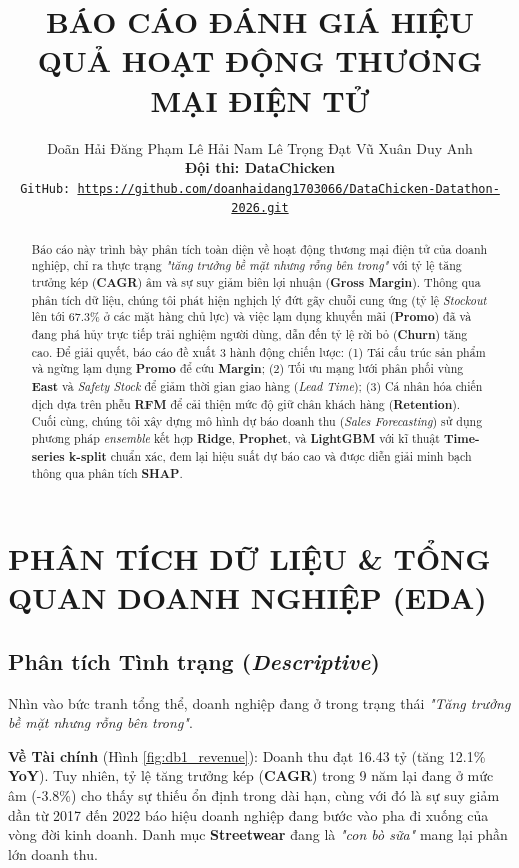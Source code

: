 \documentclass{article}
\title{BÁO CÁO ĐÁNH GIÁ HIỆU QUẢ HOẠT ĐỘNG THƯƠNG MẠI ĐIỆN TỬ}
\author{%
  Doãn Hải Đăng \quad Phạm Lê Hải Nam \quad Lê Trọng Đạt \quad Vũ Xuân Duy Anh \\
  \textbf{Đội thi: DataChicken} \\
  \texttt{GitHub: \url{https://github.com/doanhaidang1703066/DataChicken-Datathon-2026.git}}
}
\begin{document}
\maketitle

\begin{abstract}
Báo cáo này trình bày phân tích toàn diện về hoạt động thương mại điện tử của doanh nghiệp, chỉ ra thực trạng \textit{"tăng trưởng bề mặt nhưng rỗng bên trong"} với tỷ lệ tăng trưởng kép (\textbf{CAGR}) âm và sự suy giảm biên lợi nhuận (\textbf{Gross Margin}). Thông qua phân tích dữ liệu, chúng tôi phát hiện nghịch lý đứt gãy chuỗi cung ứng (tỷ lệ \textit{Stockout} lên tới 67.3\% ở các mặt hàng chủ lực) và việc lạm dụng khuyến mãi (\textbf{Promo}) đã và đang phá hủy trực tiếp trải nghiệm người dùng, dẫn đến tỷ lệ rời bỏ (\textbf{Churn}) tăng cao. Để giải quyết, báo cáo đề xuất 3 hành động chiến lược: (1) Tái cấu trúc sản phẩm và ngừng lạm dụng \textbf{Promo} để cứu \textbf{Margin}; (2) Tối ưu mạng lưới phân phối vùng \textbf{East} và \textit{Safety Stock} để giảm thời gian giao hàng (\textit{Lead Time}); (3) Cá nhân hóa chiến dịch dựa trên phễu \textbf{RFM} để cải thiện mức độ giữ chân khách hàng (\textbf{Retention}). Cuối cùng, chúng tôi xây dựng mô hình dự báo doanh thu (\textit{Sales Forecasting}) sử dụng phương pháp \textit{ensemble} kết hợp \textbf{Ridge}, \textbf{Prophet}, và \textbf{LightGBM} với kĩ thuật \textbf{Time-series k-split} chuẩn xác, đem lại hiệu suất dự báo cao và được diễn giải minh bạch thông qua phân tích \textbf{SHAP}.
\end{abstract}

\section{PHÂN TÍCH DỮ LIỆU \& TỔNG QUAN DOANH NGHIỆP (EDA)}

\subsection{Phân tích Tình trạng (\textit{Descriptive})}

Nhìn vào bức tranh tổng thể, doanh nghiệp đang ở trong trạng thái \textit{"Tăng trưởng bề mặt nhưng rỗng bên trong"}.

\textbf{Về Tài chính} (Hình \ref{fig:db1_revenue}): Doanh thu đạt 16.43 tỷ (tăng 12.1\% \textbf{YoY}). Tuy nhiên, tỷ lệ tăng trưởng kép (\textbf{CAGR}) trong 9 năm lại đang ở mức âm (-3.8\%) cho thấy sự thiếu ổn định trong dài hạn, cùng với đó là sự suy giảm dần từ 2017 đến 2022 báo hiệu doanh nghiệp đang bước vào pha đi xuống của vòng đời kinh doanh. Danh mục \textbf{Streetwear} đang là \textit{"con bò sữa"} mang lại phần lớn doanh thu.
\end{document}
